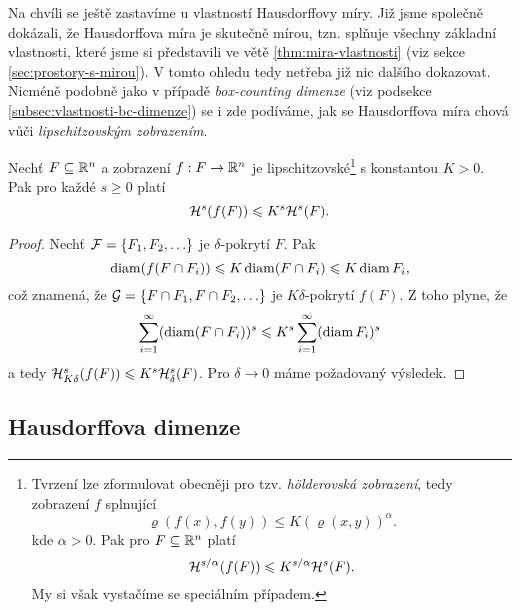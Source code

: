 Na chvíli se ještě zastavíme u vlastností Hausdorffovy míry. Již jsme společně dokázali, že Hausdorffova míra je skutečně mírou, tzn. splňuje všechny základní vlastnosti, které jsme si představili ve větě \ref{thm:mira-vlastnosti} (viz sekce \ref{sec:prostory-s-mirou}). V tomto ohledu tedy netřeba již nic dalšího dokazovat. Nicméně podobně jako v případě \emph{box-counting dimenze} (viz podsekce \ref{subsec:vlastnosti-bc-dimenze}) se i zde podíváme, jak se Hausdorffova míra chová vůči \emph{lipschitzovským zobrazením}.
\begin{theorem}
    Nechť $F\subseteq\R^n$ a zobrazení $\mapping{f}{F}{\R^n}$ je lipschitzovské\footnote{Tvrzení lze zformulovat obecněji pro tzv. \emph{hölderovská zobrazení}, tedy zobrazení $f$ splnující
    \[\varrho(f(x),f(y))\leqslant K(\varrho(x,y))^\alpha.\]
    kde $\alpha>0$. Pak pro $F\subseteq\R^n$ platí
    \[\hausdorffmeasure{s/\alpha}(f(F))\leqslant K^{s/\alpha}\hausdorffmeasure{s}(F).\]
    My si však vystačíme se speciálním případem.} s konstantou $K>0$. Pak pro každé $s\geqslant 0$ platí
    \[\hausdorffmeasure{s}(f(F))\leqslant K^s\hausdorffmeasure{s}(F).\]
\end{theorem}
\begin{proof}
    Nechť $\mathcal{F}=\set{F_1,F_2,\ldots}$ je $\delta$-pokrytí $F$. Pak
    \[\diam(f(F\cap F_i))\leqslant K\diam(F\cap F_i)\leqslant K\diam{F_i},\]
    což znamená, že $\mathcal{G}=\set{F\cap F_1,F\cap F_2,\ldots}$ je $K\delta$-pokrytí $f(F)$. Z toho plyne, že
    \[\sum_{i=1}^{\infty}(\diam(F\cap F_i))^s\leqslant K^s\sum_{i=1}^{\infty}(\diam{F_i})^s\]
    a tedy $\hausdorffdeltameasure{s}{K\delta}(f(F))\leqslant K^s\hausdorffdeltameasure{s}{\delta}(F)$. Pro $\delta\to 0$ máme požadovaný výsledek.
\end{proof}

\subsection{Hausdorffova dimenze}\label{subsec:hausdorffova-dimenze}

